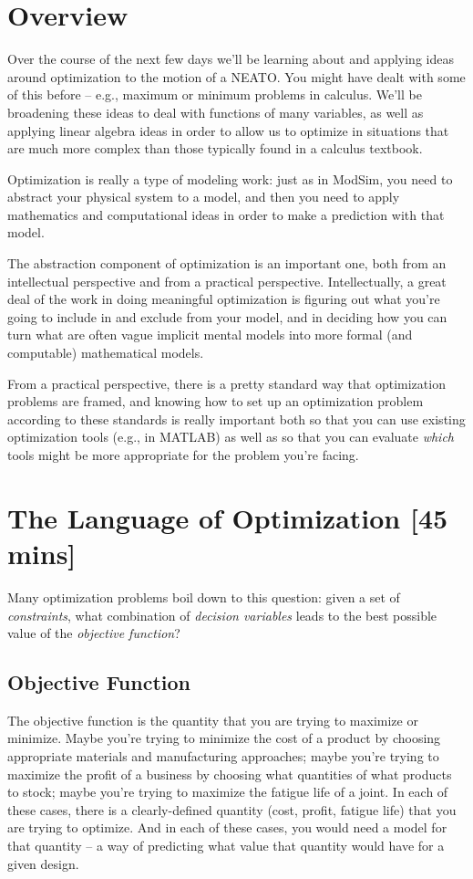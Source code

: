 \documentclass{tufte-handout}
\begin{document}
\clearpage

\section{Overview}

Over the course of the next few days we'll be learning about and applying ideas around optimization to the motion of a NEATO.  You might have dealt with some of this before -- e.g., maximum or minimum problems in calculus.  We'll be broadening these ideas to deal with functions of many variables, as well as applying linear algebra ideas in order to allow us to optimize in situations that are much more complex than those typically found in a calculus textbook.

Optimization is really a type of modeling work: just as in ModSim, you need to abstract your physical system to a model, and then you need to apply mathematics and computational ideas in order to make a prediction with that model.

The abstraction component of optimization is an important one, both from an intellectual perspective and from a practical perspective.  Intellectually, a great deal of the work in doing meaningful optimization is figuring out what you're going to include in and exclude from your model, and in deciding how you can turn what are often vague implicit mental models into more formal (and computable) mathematical models.

From a practical perspective, there is a pretty standard way that optimization problems are framed, and knowing how to set up an optimization problem according to these standards is really important both so that you can use existing optimization tools (e.g., in MATLAB) as well as so that you can evaluate {\it which} tools might be more appropriate for the problem you're facing.

\section{The Language of Optimization [45 mins]}

Many optimization problems boil down to this question:  given a set of {\it constraints}, what combination of {\it decision variables} leads to the best possible value of the {\it objective function}?

\subsection{Objective Function}
The objective function is the quantity that you are trying to maximize or minimize.  Maybe you're trying to minimize the cost of a product by choosing appropriate materials and manufacturing approaches; maybe you're trying to maximize the profit of a business  by choosing what quantities of what products to stock; maybe you're trying to maximize the fatigue life of a joint.  In each of these cases, there is a clearly-defined quantity (cost, profit, fatigue life) that you are trying to optimize.  And in each of these cases, you would need a model for that quantity -- a way of predicting what value that quantity would have for a given design.
\end{document}
